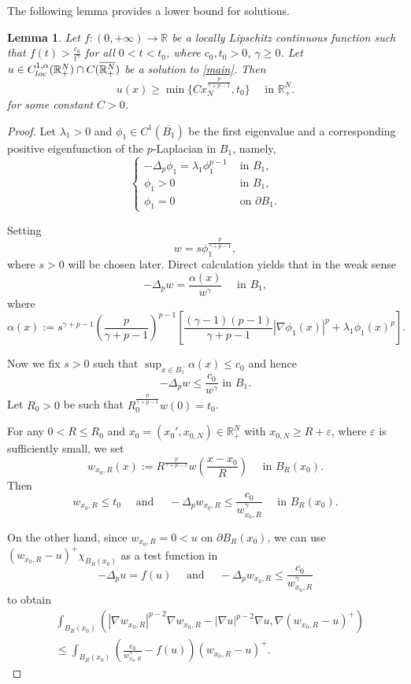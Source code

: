 \documentclass[reqno]{amsart}
\theoremstyle{plain}
\newtheorem{lemma}[theorem]{Lemma}
\theoremstyle{definition}
\theoremstyle{remark}
\begin{document}
	The following lemma provides a lower bound for solutions.
	\begin{lemma}\label{lem:lower_bound}
		Let $f:(0,+\infty)\to\mathbb{R}$ be a locally Lipschitz continuous function such that $f(t) > \frac{c_0}{t^\gamma}$ for all $0<t<t_0$, where $c_0,t_0>0$, $\gamma\ge0$. Let $u \in C^{1,\alpha}_{\rm loc}(\mathbb{R}^N_+) \cap C(\overline{\mathbb{R}^N_+})$ be a solution to \eqref{main}. Then
		\[
		u(x) \ge \min\{C x_N^\frac{p}{\gamma+p-1}, t_0\} \quad\text{ in } \mathbb{R}^N_+.
		\]
		for some constant $C>0$.
	\end{lemma}
	
	\begin{proof}
		Let $\lambda_1>0$ and $\phi_1 \in C^1(\overline{B_1})$ be the first eigenvalue and a corresponding positive eigenfunction of the $p$-Laplacian in $B_1$, namely,
		\[
		\begin{cases}
			-\Delta_p \phi_1 = \lambda_1 \phi_1^{p-1} & \text{ in } B_1,\\
			\phi_1 > 0 & \text{ in } B_1,\\
			\phi_1 = 0 & \text{ on } \partial B_1.
		\end{cases}
		\]
		
		Setting
		\[
		w = s \phi_1^\frac{p}{\gamma+p-1},
		\]
		where $s>0$ will be chosen later. Direct calculation yields that in the weak sense
		\[
		-\Delta_p w = \frac{\alpha(x)}{w^\gamma} \quad \text{ in } B_1,
		\]
		where
		\[
		\alpha(x) := s^{\gamma+p-1} \left(\frac{p}{\gamma+p-1}\right)^{p-1} \left[\frac{(\gamma-1)(p-1)}{\gamma+p-1}|\nabla\phi_1(x)|^p + \lambda_1\phi_1(x)^p\right].
		\]
		
		Now we fix $s>0$ such that $\sup_{x\in B_1}\alpha(x) \le c_0$ and hence
		\[
		-\Delta_p w \le \frac{c_0}{w^\gamma} \text{ in } B_1.
		\]
		Let $R_0>0$ be such that $R_0^\frac{p}{\gamma+p-1} w(0) = t_0$.
		
		For any $0<R\le R_0$ and $x_0 = (x_0', x_{0,N})\in\mathbb{R}^N_+$ with $x_{0,N} \ge R + \varepsilon$, where $\varepsilon$ is sufficiently small, we set
		\[
		w_{x_0,R}(x) := R^\frac{p}{\gamma+p-1}w\left(\frac{x-x_0}{R}\right) \quad\text{ in } B_R(x_0).
		\]
		Then
		\[
		w_{x_0,R} \le t_0 \quad\text{ and }\quad -\Delta_p w_{x_0,R} \le \frac{c_0}{w_{x_0,R}^\gamma} \quad\text{ in } B_R(x_0).
		\]
		
		On the other hand, since $w_{x_0,R}=0 < u$ on $\partial B_R(x_0)$, we can use $(w_{x_0,R}-u)^+ \chi_{B_R(x_0)}$ as a test function in
		\[
		-\Delta_p u = f(u)
		\quad\text{ and }\quad
		-\Delta_p w_{x_0,R} \le \frac{c_0}{w_{x_0,R}^\gamma}
		\]
		to obtain
		\begin{align*}
			&\int_{B_R(x_0)} (|\nabla w_{x_0,R}|^{p-2}\nabla w_{x_0,R} - |\nabla u|^{p-2}\nabla u, \nabla (w_{x_0,R}-u)^+) \\
			&\le \int_{B_R(x_0)} \left(\frac{c_0}{w_{x_0,R}^\gamma} - f(u)\right) (w_{x_0,R}-u)^+.
		\end{align*}
		

\end{proof}
\end{document}
